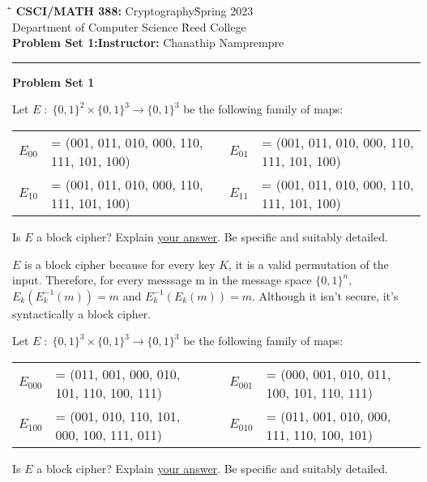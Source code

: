 \documentclass{exam}
\def\COURSENAME{Cryptography}
\def\COURSECODE{CSCI/MATH 388}
\def\YEAR{2023}
\newcommand{\Colon}{\;:\;}
\newcommand{\bits}{\{0,1\}}
\begin{document}
\begin{tabbing}
  \`\=\kill
  \textbf{\COURSECODE:} \COURSENAME \` Spring \YEAR \\
  Department of Computer Science \` Reed College \\
  \textbf{Problem Set 1:}\` \textbf{Instructor:} Chanathip Namprempre
\end{tabbing}


\hrule

\vspace{.4in}

\begin{center}
\textbf{\Large Problem Set 1}
\end{center}


\vspace{.2in}


\begin{questions}

  \question Let $E \Colon \bits^2 \times \bits^3 \rightarrow \bits^3$ be the following family of maps:
  \begin{center}
    \begin{small}
      \begin{tabular}{lllll}
        $E_{00}$ & = (001, 011, 010, 000, 110, 111, 101, 100) &&
        $E_{01}$ & = (001, 011, 010, 000, 110, 111, 101, 100) \\
        $E_{10}$ & = (001, 011, 010, 000, 110, 111, 101, 100) &&
        $E_{11}$ & = (001, 011, 010, 000, 110, 111, 101, 100)
      \end{tabular}
    \end{small}%
  \end{center}
  \noindent Is $E$ a block cipher? Explain \underline{your answer}. Be specific and suitably detailed.

  $E$ is a block cipher because for every key $K$, it is a valid permutation of the input. Therefore, for every messsage m in the message space $\{0,1\}^n$, $E_k(E_k^{-1}(m)) = m$ and $E_k^{-1}(E_k(m)) = m$. Although it isn't secure, it's syntactically a block cipher.
  \bigskip

  \question Let $E \Colon \bits^3 \times \bits^3 \rightarrow \bits^3$ be the following family of maps:
  \begin{center}
    \begin{small}
      \begin{tabular}{lllll}
        $E_{000}$ & = (011, 001, 000, 010, 101, 110, 100, 111)  &&
        $E_{001}$ & = (000, 001, 010, 011, 100, 101, 110, 111) \\
        $E_{100}$ & = (001, 010, 110, 101, 000, 100, 111, 011)  &&
        $E_{010}$ & = (011, 001, 010, 000, 111, 110, 100, 101)
      \end{tabular}
    \end{small}%
  \end{center}
  \noindent Is $E$ a block cipher? Explain \underline{your answer}. Be specific and suitably detailed.


\end{questions}
\end{document}
